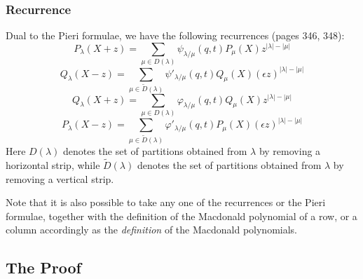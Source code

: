\documentclass[12pt,dvips]{amsart}
\begin{document}
\medskip
\noindent
\subsubsection{Recurrence}
Dual to the Pieri formulae, we have the following recurrences \cite{BLACK} (pages 346, 348):
$$ P_\lambda(X + z) = \sum_{\mu \in D(\lambda)}\psi_{\lambda / \mu}(q,t)P_\mu(X) z^{|\lambda| - |\mu|}$$
$$ Q_\lambda(X - z) = \sum_{\mu \in \tilde{D}(\lambda)}\psi'_{\lambda / \mu}(q,t)Q_\mu(X) (\epsilon z)^{|\lambda| - |\mu|}$$
$$ Q_\lambda(X + z) = \sum_{\mu \in D(\lambda)} \varphi_{\lambda / \mu}(q,t)Q_\mu(X) z^{|\lambda| - |\mu|}$$
$$ P_\lambda(X - z) = \sum_{\mu \in \tilde{D}(\lambda)} \varphi'_{\lambda / \mu}(q,t) P_\mu(X)(\epsilon z)^{|\lambda| - |\mu|}$$
Here $D(\lambda)$ denotes the set of partitions obtained from $\lambda$ by removing a horizontal strip, while $\tilde{D}(\lambda)$ denotes the set of partitions obtained from $\lambda$ by removing a vertical strip.

\smallskip
Note that it is also possible to take any one of the recurrences or the Pieri formulae, together with the definition of the Macdonald polynomial of a row, or a column accordingly  as the {\it definition} of the Macdonald polynomials. 

\bigskip\bigskip
\subsection{The Proof}\label{proof}
\end{document}
